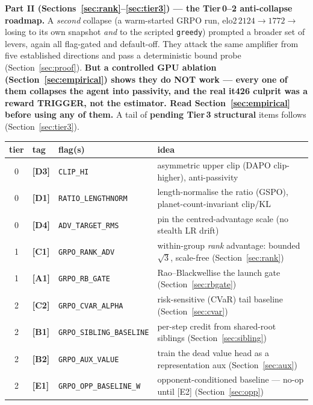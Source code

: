 \documentclass[11pt]{article}
\newcommand{\cd}[1]{\texttt{#1}}
\begin{document}
\begin{center}
\smallskip
\textbf{Part II (Sections~\ref{sec:rank}--\ref{sec:tier3}) --- the Tier\,0--2 anti-collapse roadmap.} A
\emph{second} collapse (a warm-started GRPO run, $\mathrm{elo2}\,2124\!\to\!1772\!\to$ losing to its own
snapshot \emph{and} to the scripted \cd{greedy}) prompted a broader set of levers, again all flag-gated
and default-off. They attack the same amplifier from five established directions and pass a deterministic
bound probe (Section~\ref{sec:proof}). \textbf{But a controlled GPU ablation (Section~\ref{sec:empirical})
shows they do NOT work --- every one of them collapses the agent into passivity, and the real it426 culprit
was a reward TRIGGER, not the estimator. Read Section~\ref{sec:empirical} before using any of them.} A tail
of \textbf{pending Tier\,3 structural} items follows (Section~\ref{sec:tier3}).
\begin{center}\small
\begin{tabular}{@{}clll@{}}
\toprule
tier & tag & flag(s) & idea \\
\midrule
0 & \textbf{[D3]} & \cd{CLIP\_HI} & asymmetric upper clip (DAPO clip-higher), anti-passivity \\
0 & \textbf{[D1]} & \cd{RATIO\_LENGTHNORM} & length-normalise the ratio (GSPO), planet-count-invariant clip/KL \\
0 & \textbf{[D4]} & \cd{ADV\_TARGET\_RMS} & pin the centred-advantage scale (no stealth LR drift) \\
1 & \textbf{[C1]} & \cd{GRPO\_RANK\_ADV} & within-group \emph{rank} advantage: bounded $\sqrt3$, scale-free (Section~\ref{sec:rank}) \\
1 & \textbf{[A1]} & \cd{GRPO\_RB\_GATE} & Rao--Blackwellise the launch gate (Section~\ref{sec:rbgate}) \\
2 & \textbf{[C2]} & \cd{GRPO\_CVAR\_ALPHA} & risk-sensitive (CVaR) tail baseline (Section~\ref{sec:cvar}) \\
2 & \textbf{[B1]} & \cd{GRPO\_SIBLING\_BASELINE} & per-step credit from shared-root siblings (Section~\ref{sec:sibling}) \\
2 & \textbf{[B2]} & \cd{GRPO\_AUX\_VALUE} & train the dead value head as a representation aux (Section~\ref{sec:aux}) \\
2 & \textbf{[E1]} & \cd{GRPO\_OPP\_BASELINE\_W} & opponent-conditioned baseline --- no-op until [E2] (Section~\ref{sec:opp}) \\
\bottomrule
\end{tabular}
\end{center}
\end{center}
\tableofcontents
\bigskip
\end{document}
